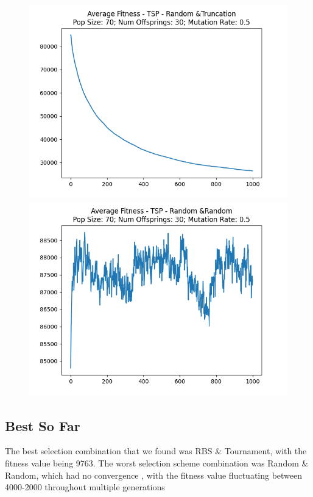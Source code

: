 \documentclass[12pt]{report}
\theoremstyle{mytheoremstyle}
\theoremstyle{mytheoremstyle}
\theoremstyle{myproblemstyle}
\begin{document}
\begin{figure}[!]
\begin{minipage}{0.4\textwidth}
		\includegraphics[width=\linewidth]{../Analysis/ASF_TSP_4_3_70_30.png}
	\end{minipage}
	\hspace{\fill}
	\begin{minipage}{0.4\textwidth}
		\includegraphics[width=\linewidth]{../Analysis/ASF_TSP_4_4_70_30.png}
	\end{minipage}
\end{figure}
\newpage

\subsection{Best So Far}
The best selection combination that we found was RBS \& Tournament, with the fitness value being 9763. The worst selection scheme combination was Random \& Random, which had no convergence , with the fitness value fluctuating between 4000-2000 throughout multiple generations
\end{document}
